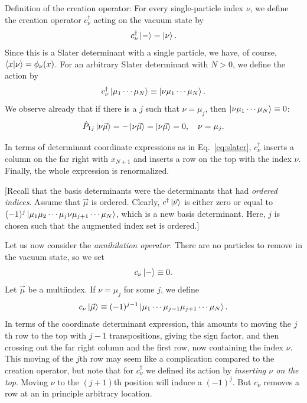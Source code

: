 \documentclass{report}
\theoremstyle{plain}
\theoremstyle{definition}
\begin{document}
Definition of the creation operator: For every single-particle index
$\nu$, we define the creation operator $c^\dag_\nu$ acting on the
vacuum state by
\begin{equation}
  c^\dag_\nu \ket{-} = \ket{\nu}.
\end{equation}
Since this is a Slater determinant with a single particle, we have, of
course, $\braket{x|\nu} = \phi_\nu(x)$.
For an arbitrary Slater determinant with $N>0$, we define the action by
\begin{equation}
  c^\dag_\nu\ket{\mu_1\cdots\mu_N} \equiv \ket{\nu\mu_1\cdots\mu_N}.
\end{equation}
We observe already that if there is a $j$ such that $\nu = \mu_j$,
then $\ket{\nu\mu_1\cdots\mu_N} \equiv 0$:
\begin{equation}
  \hat{P}_{1j} \ket{\nu\vec{\mu}} = -\ket{\nu\vec{\mu}} =
  \ket{\nu\vec{\mu}} = 0, \quad \nu = \mu_j.
\end{equation}

In terms of determinant coordinate expressions as in Eq.~\eqref{eq:slater}, $c^\dag_\nu$ inserts a
column on the far right with $x_{N+1}$ and inserts a row on the top
with the index $\nu$. Finally, the whole expression is renormalized.

[Recall that the basis determinants were the determinants that had
\emph{ordered indices}. Assume that $\vec{\mu}$ is ordered. Clearly,
$c^\dag\ket{\vec{\nu}}$ is either zero or equal to
$(-1)^j\ket{\mu_1\mu_2\cdots\mu_j\nu\mu_{j+1}\cdots \mu_N}$, which is
a new basis determinant. Here, $j$ is chosen such that the augmented
index set is ordered.]

Let us now consider the \emph{annihilation operator}. There are no
particles to remove in the vacuum state, so we set
\begin{equation}
  c_\nu \ket{-} \equiv 0.
\end{equation}
Let $\vec{\mu}$ be a multiindex. If $\nu=\mu_j$ for some $j$, we
define
\begin{equation}
  c_\nu \ket{\vec{\mu}} \equiv
  (-1)^{j-1} \ket{\mu_1\cdots\mu_{j-1}\mu_{j+1}\cdots\mu_N}.
\end{equation}
In terms of the coordinate determinant expression, this amounts to
moving the $j$th row to the top with $j-1$ transpositions, giving the sign factor, and
then crossing out the far right column and the first row, now
containing the index $\nu$. This moving of the $j$th row
may seem like a complication compared to the creation operator, but
note that for $c^\dag_\nu$ we defined its action by \emph{inserting
  $\nu$ on the top}. Moving $\nu$ to the $(j+1)$th position will
induce a $(-1)^j$. But $c_\nu$ removes a row at an in principle
arbitrary location.
\end{document}
